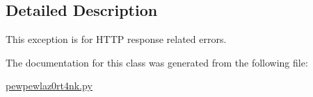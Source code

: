 \subsection{Detailed Description}
\begin{DoxyVerb}This exception is for HTTP response related errors.\end{DoxyVerb}
 

The documentation for this class was generated from the following file\+:\begin{DoxyCompactItemize}
\item 
\hyperlink{pewpewlaz0rt4nk_8py}{pewpewlaz0rt4nk.\+py}\end{DoxyCompactItemize}

